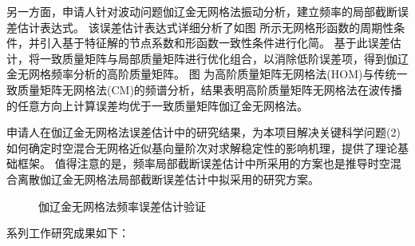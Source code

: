 另一方面，申请人针对波动问题伽辽金无网格法振动分析，建立频率的局部截断误差估计表达式。
该误差估计表达式详细分析了如图  所示无网格形函数的周期性条件，并引入基于特征解的节点系数和形函数一致性条件进行化简。
基于此误差估计，将一致质量矩阵与局部质量矩阵进行优化组合，以消除低阶误差项，得到伽辽金无网格频率分析的高阶质量矩阵。
图  为高阶质量矩阵无网格法(HOM)与传统一致质量矩阵无网格法(CM)的频谱分析，结果表明高阶质量矩阵无网格法在波传播的任意方向上计算误差均优于一致质量矩阵伽辽金无网格法。

申请人在伽辽金无网格法误差估计中的研究结果，为本项目解决关键科学问题(2)如何确定时空混合无网格近似基向量阶次对求解稳定性的影响机理，提供了理论基础框架。
值得注意的是，频率局部截断误差估计中所采用的方案也是推导时空混合离散伽辽金无网格法局部截断误差估计中拟采用的研究方案。

\begin{figure}[!h]
    \centering 
    \caption{伽辽金无网格法频率误差估计验证}
    \label{fg:frequency}
\end{figure}


系列工作研究成果如下：


